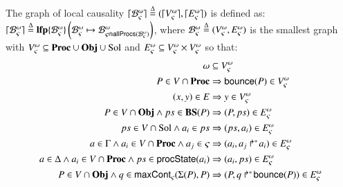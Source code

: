 \begin{definition}
\label{def:glc}
  The graph of local causality $\lceil \mathcal{B}_\varsigma^\omega\rceil \stackrel{\Delta}= (\lceil V_\varsigma^\omega\rceil, \lceil E_\varsigma^\omega\rceil)$ is defined as: $\lceil \mathcal{B}_\varsigma^\omega\rceil \stackrel{\Delta}= \mathbf{lfp}\{\mathcal{B}^\omega_\varsigma\}\left(\mathcal{B}^\omega_\varsigma\mapsto\mathcal{B}^\omega_{\varsigma \Cap \mathsf{allProcs}(\mathcal{B}^\omega_\varsigma)}\right)$,
  where $\mathcal{B}^\omega_\varsigma \stackrel{\Delta}= (V_\varsigma^\omega, E_\varsigma^\omega)$ is the smallest graph with
  $V_\varsigma^\omega \subseteq \mathbf{Proc} \cup \mathbf{Obj} \cup \mathrm{Sol}$ and $E_\varsigma^\omega \subseteq V_\varsigma^\omega \times V_\varsigma^\omega$
  so that:
  \begin{align}
    \omega &\subseteq V_\varsigma^\omega \label{eq:Vw} \\
    P \in V \cap \mathbf{Proc} &\Rightarrow \mathsf{bounce}(P) \in V_\varsigma^\omega \label{eq:Vproc} \\
    (x, y) \in E &\Rightarrow y \in V_\varsigma^\omega \label{eq:VE} \\
    P \in V \cap \mathbf{Obj} \wedge ps \in \mathbf{BS}(P) &\Rightarrow (P, ps) \in E_\varsigma^\omega \label{eq:ESol1} \\
    ps \in V \cap \mathrm{Sol} \wedge a_i \in ps &\Rightarrow (ps, a_i) \in E_\varsigma^\omega \label{eq:ESol2} \\
    a \in \Gamma \wedge a_i \in V \cap \mathbf{Proc} \wedge a_j \in \varsigma &\Rightarrow (a_i, \mbox{${a}_{j}\Rsh^*\!{a}_{i}$}) \in E_\varsigma^\omega \label{eq:EReq} \\
    a \in \Delta \wedge a_i \in V \cap \mathbf{Proc} \wedge ps \in \mathsf{procState}(a_i) &\Rightarrow (a_i, ps) \in E_\varsigma^\omega \label{eq:EPrio} \\
    P \in V \cap \mathbf{Obj} \wedge q \in \mathsf{maxCont}_\varsigma(\Sigma(P), P) &\Rightarrow (P, \mbox{$q\Rsh^*\!\mathsf{bounce}(P)$}) \in E_\varsigma^\omega \label{eq:ECont} \!
  \end{align}
\end{definition}

\begin{comment}
\pref{eq:Vw}, \eqref{eq:Vproc} and \eqref{eq:VE} ensure that all required nodes are in $\cwV$.
Elements in $\PHproc$ are required processes,
elements in $\Obj$ are the objectives to reach these processes
and elements in $\Sol$ are the sets of processes that allow to solve these objectives.
\pref{eq:ESol1} links an objective $P$ to its solutions in $\BS(P)$
and \pref{eq:ESol2} links a solution $ps$ to the processes $a_i \in ps$ it contains.
Then, \pref{eq:EReq} links a required component process $a_i$ to all objectives $\PHobjp{a}{j}{i}$ with $a_j \in \ctx$
while \pref{eq:EPrio} links a required cooperative sort process $a_i$ to its solutions in $\csState(a_i)$.
Finally, if the resolution of an objective $P$ requires a process of $\PHsort(P)$, then \pref{eq:ECont} re-targets this objective ($\gCont$).
\end{comment}

